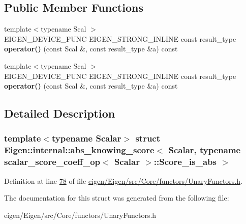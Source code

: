 \subsection*{Public Member Functions}
\begin{DoxyCompactItemize}
\item 
\mbox{\label{struct_eigen_1_1internal_1_1abs__knowing__score_3_01_scalar_00_01typename_01scalar__score__coeff5c3b449f8772ed2666062ac71b9807cd_a89e1f41591ec9a2f8d674296403b6426}} 
{\footnotesize template$<$typename Scal $>$ }\\E\+I\+G\+E\+N\+\_\+\+D\+E\+V\+I\+C\+E\+\_\+\+F\+U\+NC E\+I\+G\+E\+N\+\_\+\+S\+T\+R\+O\+N\+G\+\_\+\+I\+N\+L\+I\+NE const result\+\_\+type {\bfseries operator()} (const Scal \&, const result\+\_\+type \&a) const
\item 
\mbox{\label{struct_eigen_1_1internal_1_1abs__knowing__score_3_01_scalar_00_01typename_01scalar__score__coeff5c3b449f8772ed2666062ac71b9807cd_a89e1f41591ec9a2f8d674296403b6426}} 
{\footnotesize template$<$typename Scal $>$ }\\E\+I\+G\+E\+N\+\_\+\+D\+E\+V\+I\+C\+E\+\_\+\+F\+U\+NC E\+I\+G\+E\+N\+\_\+\+S\+T\+R\+O\+N\+G\+\_\+\+I\+N\+L\+I\+NE const result\+\_\+type {\bfseries operator()} (const Scal \&, const result\+\_\+type \&a) const
\end{DoxyCompactItemize}


\subsection{Detailed Description}
\subsubsection*{template$<$typename Scalar$>$\newline
struct Eigen\+::internal\+::abs\+\_\+knowing\+\_\+score$<$ Scalar, typename scalar\+\_\+score\+\_\+coeff\+\_\+op$<$ Scalar $>$\+::\+Score\+\_\+is\+\_\+abs $>$}



Definition at line \hyperlink{eigen_2_eigen_2src_2_core_2functors_2_unary_functors_8h_source_l00078}{78} of file \hyperlink{eigen_2_eigen_2src_2_core_2functors_2_unary_functors_8h_source}{eigen/\+Eigen/src/\+Core/functors/\+Unary\+Functors.\+h}.



The documentation for this struct was generated from the following file\+:\begin{DoxyCompactItemize}
\item 
eigen/\+Eigen/src/\+Core/functors/\+Unary\+Functors.\+h\end{DoxyCompactItemize}
